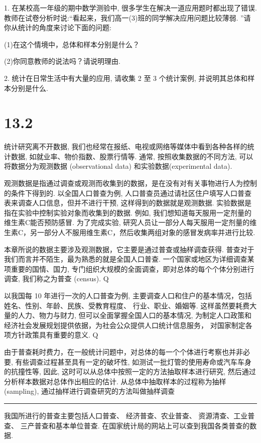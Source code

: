 \documentclass[10pt]{article}
\newcommand{\HRule}{\begin{center}\rule{0.9\linewidth}{0.2mm}\end{center}}
\begin{document}
1. 在某校高一年级的期中数学测验中, 很多学生在解决一道应用题时都出现了错误. 教师在试卷分析时说:“看起来，我们高一(3)班的同学解决应用问题比较薄弱. ”请你从统计的角度来讨论下面的问题:

(1)在这个情境中，总体和样本分别是什么？

(2)你同意教师的说法吗？请说明理由.

2. 统计在日常生活中有大量的应用, 请收集 2 至 3 个统计案例, 并说明其总体和样本分别是什么.

\section*{13.2}

统计研究离不开数据, 我们也经常在报纸、电视或网络等媒体中看到各种各样的统计数据, 如就业率、物价指数、股票行情等. 通常, 按照收集数据的不同方法, 可以将数据分为观测数据 (observational data) 和实验数据(experimental data).

观测数据是指通过调查或观测而收集到的数据，是在没有对有关事物进行人为控制的条件下得到的. 以全国人口普查为例, 人口普查员通过请社区住户填写人口普查表来调查人口信息，但并不进行干预, 这样得到的数据就是观测数据. 实验数据是指在实验中控制实验对象而收集到的数据. 例如, 我们想知道每天服用一定剂量的维生素C能否预防感冒. 为了完成实验, 研究人员让一部分人每天服用一定剂量的维生素C，另一部分人不服用维生素C，然后收集两组对象的感冒发病率并进行比较.

本章所说的数据主要涉及观测数据，它主要是通过普查或抽样调查获得. 普查对于我们而言并不陌生，最为熟悉的就是全国人口普查. 一个国家或地区为详细调查某项重要的国情、国力, 专门组织大规模的全面调查，即对总体的每个个体分别进行调查, 我们称之为普查 (census). Q

以我国每 10 年进行一次的人口普查为例, 主要调查人口和住户的基本情况，包括姓名、性别、年龄、民族、受教育程度、 行业、职业、婚姻等. 这样虽然要耗费大量的人力、物力与财力, 但可以全面掌握全国人口的基本情况, 为制定人口政策和经济社会发展规划提供依据，为社会公众提供人口统计信息服务， 对国家制定各项方针政策具有重要的意义. Q

由于普查耗时费力，在一般统计问题中，对总体的每一个个体进行考察也并非必要, 有些调查过程甚至具有一定的破坏性, 如测试一批灯管的使用寿命或汽车车身的抗撞性等, 因此, 这时可以从总体中按照一定的方法抽取样本进行研究, 然后通过分析样本数据对总体作出相应的估计. 从总体中抽取样本的过程称为抽样(sampling), 通过抽样进行调查研究的方法叫做抽样调查



\HRule

我国所进行的普查主要包括人口普查、 经济普查、农业普查、 资源清查、工业普查、 三产普查和基本单位普查. 在国家统计局的网站上可以查到我国各类普查的数据.
\end{document}
